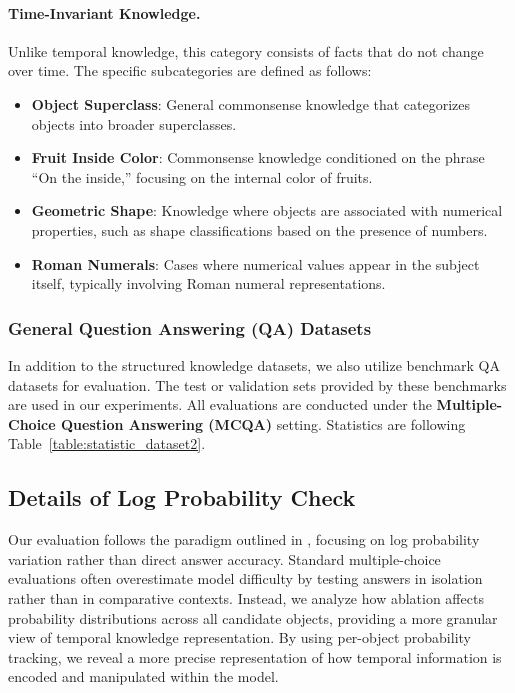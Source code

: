 \paragraph{Time-Invariant Knowledge.} Unlike temporal knowledge, this category consists of facts that do not change over time.
The specific subcategories are defined as follows:
\begin{itemize}
    \item \textbf{Object Superclass}: General commonsense knowledge that categorizes objects into broader superclasses.
    \item \textbf{Fruit Inside Color}: Commonsense knowledge conditioned on the phrase ``On the inside,'' focusing on the internal color of fruits.
    \item \textbf{Geometric Shape}: Knowledge where objects are associated with numerical properties, such as shape classifications based on the presence of numbers.
    \item \textbf{Roman Numerals}: Cases where numerical values appear in the subject itself, typically involving Roman numeral representations.
\end{itemize}

\subsubsection{General Question Answering (QA) Datasets}
In addition to the structured knowledge datasets, we also utilize benchmark QA datasets for evaluation. 
The test or validation sets provided by these benchmarks are used in our experiments. 
All evaluations are conducted under the \textbf{Multiple-Choice Question Answering (MCQA)} setting.
Statistics are following Table~\ref{table:statistic_dataset2}.

\subsection{Details of Log Probability Check}
\label{sec:log_evaluation_details}
Our evaluation follows the paradigm outlined in \citealt{logprob}, focusing on log probability variation rather than direct answer accuracy.  
Standard multiple-choice evaluations often overestimate model difficulty by testing answers in isolation rather than in comparative contexts.
Instead, we analyze how ablation affects probability distributions across all candidate objects, providing a more granular view of temporal knowledge representation.
By using per-object probability tracking, we reveal a more precise representation of how temporal information is encoded and manipulated within the model.
